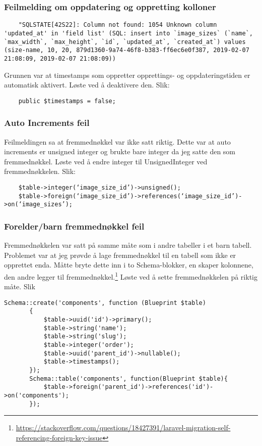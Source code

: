 \subsubsection{Feilmelding om oppdatering og oppretting kolloner}
\begin{lstlisting}
    "SQLSTATE[42S22]: Column not found: 1054 Unknown column 'updated_at' in 'field list' (SQL: insert into `image_sizes` (`name`, `max_width`, `max_height`, `id`, `updated_at`, `created_at`) values (size-name, 10, 20, 879d1360-9a74-46f8-b383-ff6ec6e0f387, 2019-02-07 21:08:09, 2019-02-07 21:08:09))
\end{lstlisting}
Grunnen var at timestamps som oppretter opprettings- og oppdateringstiden er automatisk aktivert.
Løste ved å deaktivere den. Slik: 

\begin{lstlisting}
    public $timestamps = false;
\end{lstlisting}

\subsubsection{Auto Increments feil}
Feilmeldingen sa at fremmednøkkel var ikke satt riktig.
Dette var at auto increments er unsigned integer og brukte bare integer da jeg satte den som fremmednøkkel.
Løste ved å endre integer til UnsignedInteger ved fremmednøkkelen. Slik:

\begin{lstlisting}
    $table->integer(‘image_size_id’)->unsigned();
    $table->foreign(‘image_size_id’)->references(‘image_size_id’)->on(‘image_sizes’);
\end{lstlisting}

\subsubsection{Forelder/barn fremmednøkkel feil}
Fremmednøkkelen var satt på samme måte som i andre tabeller i et barn tabell. Problemet var at jeg prøvde å lage fremmednøkkel til en tabell som ikke er opprettet enda.
Måtte bryte dette inn i to Schema-blokker, en skaper kolonnene, den andre legger til fremmednøkkel.\footnote{\url{https://stackoverflow.com/questions/18427391/laravel-migration-self-referencing-foreign-key-issue}}
Løste ved å sette fremmednøkkelen på riktig måte. Slik
\begin{lstlisting}
Schema::create('components', function (Blueprint $table)
       {
           $table->uuid('id')->primary();
           $table->string('name');
           $table->string('slug');
           $table->integer('order');
           $table->uuid('parent_id')->nullable();
           $table->timestamps();
       });
       Schema::table('components', function(Blueprint $table){
           $table->foreign('parent_id')->references('id')->on('components');
       });
\end{lstlisting}


